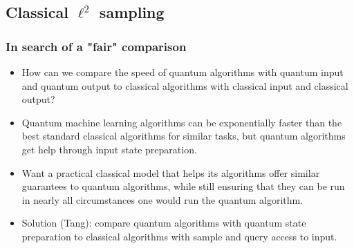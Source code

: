 \documentclass{beamer}
\newcommand\0{\mathbf{0}}
\newcommand\<{\langle}
\renewcommand\>{\rangle}
\begin{document}
%

\subsection{Classical $\ell^2$ sampling}

\begin{frame}
\frametitle{In search of a "fair" comparison}	

\begin{itemize}
\item How can we compare the speed of quantum algorithms with quantum input and quantum output to classical algorithms with classical input and classical output? 
\item Quantum machine learning algorithms can be exponentially faster than the best standard classical algorithms for similar tasks, but quantum algorithms get help through input state preparation. 
\item Want a practical classical model that helps its algorithms offer similar guarantees to quantum algorithms, while still ensuring that they can be run in nearly all circumstances one would run the quantum algorithm. 
\pause
\item Solution (Tang): compare quantum algorithms with quantum state preparation to classical algorithms with sample and query access to input.	
\end{itemize}
\end{frame}
\end{document}
